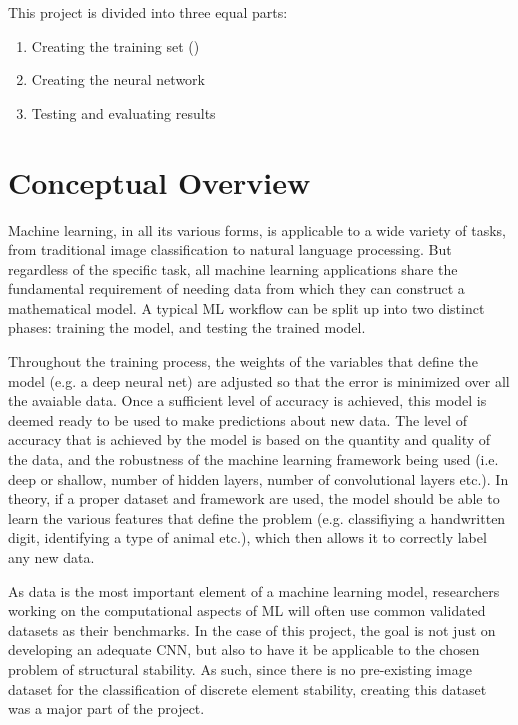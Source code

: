 \documentclass[final,3p]{CSP}
\begin{document}
		This project is divided into three equal parts:
		\begin{enumerate}
			\item Creating the training set ()
			\item Creating the neural network 
			\item Testing and evaluating results
		\end{enumerate}
		
	\section{Conceptual Overview}
	
		Machine learning, in all its various forms, is applicable to a wide variety of tasks, from traditional image classification to natural language processing. But regardless of the specific task, all machine learning applications share the fundamental requirement of needing data from which they can construct a mathematical model. A typical ML workflow can be split up into two distinct phases: training the model, and testing the trained model.
		
		Throughout the training process, the weights of the variables that define the model (e.g. a deep neural net) are adjusted so that the error is minimized over all the avaiable data. Once a sufficient level of accuracy is achieved, this model is deemed ready to be used to make predictions about new data. The level of accuracy that is achieved by the model is based on the quantity and quality of the data, and the robustness of the machine learning framework being used (i.e. deep or shallow, number of hidden layers, number of convolutional layers etc.). In theory, if a proper dataset and framework are used, the model should be able to learn the various features that define the problem (e.g. classifiying a handwritten digit, identifying a type of animal etc.), which then allows it to correctly label any new data.
		
		As data is the most important element of a machine learning model, researchers working on the computational aspects of ML will often use common validated datasets as their benchmarks. In the case of this project, the goal is not just on developing an adequate CNN, but also to have it be applicable to the chosen problem of structural stability. As such, since there is no pre-existing image dataset for the classification of discrete element stability, creating this dataset was a major part of the project.
		 
\end{document}
